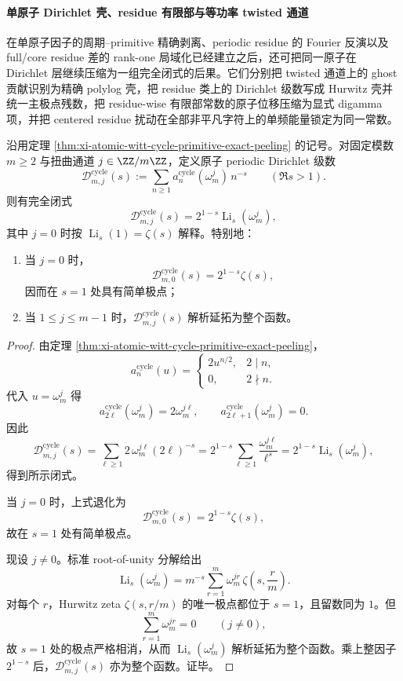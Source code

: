 \paragraph{单原子 Dirichlet 壳、residue 有限部与等功率 twisted 通道}
在单原子因子的周期--primitive 精确剥离、periodic residue 的 Fourier 反演以及 full/core residue 差的 rank-one 局域化已经建立之后，还可把同一原子在 Dirichlet 层继续压缩为一组完全闭式的后果。它们分别把 twisted 通道上的 ghost 贡献识别为精确 polylog 壳，把 residue 类上的 Dirichlet 级数写成 Hurwitz 壳并统一主极点残数，把 residue-wise 有限部常数的原子位移压缩为显式 digamma 项，并把 centered residue 扰动在全部非平凡字符上的单频能量锁定为同一常数。

\begin{theorem}\label{thm:xi-time-part77-atomic-twisted-dirichlet-polylog-shell}
沿用定理 \ref{thm:xi-atomic-witt-cycle-primitive-exact-peeling} 的记号。对固定模数 \(m\ge 2\) 与扭曲通道 \(j\in \ZZ/m\ZZ\)，定义原子 periodic Dirichlet 级数
\[
\mathcal D^{\mathrm{cycle}}_{m,j}(s)
:=
\sum_{n\ge 1}a_n^{\mathrm{cycle}}(\omega_m^j)\,n^{-s}
\qquad (\Re s>1).
\]
则有完全闭式
\[
\mathcal D^{\mathrm{cycle}}_{m,j}(s)
=
2^{1-s}\operatorname{Li}_s(\omega_m^j),
\]
其中 \(j=0\) 时按 \(\operatorname{Li}_s(1)=\zeta(s)\) 解释。特别地：
\begin{enumerate}
  \item 当 \(j=0\) 时，
  \[
  \mathcal D^{\mathrm{cycle}}_{m,0}(s)=2^{1-s}\zeta(s),
  \]
  因而在 \(s=1\) 处具有简单极点；
  \item 当 \(1\le j\le m-1\) 时，\(\mathcal D^{\mathrm{cycle}}_{m,j}(s)\) 解析延拓为整个函数。
\end{enumerate}
\end{theorem}
\begin{proof}
由定理 \ref{thm:xi-atomic-witt-cycle-primitive-exact-peeling}，
\[
a_n^{\mathrm{cycle}}(u)=
\begin{cases}
2u^{n/2},& 2\mid n,\\
0,& 2\nmid n.
\end{cases}
\]
代入 \(u=\omega_m^j\) 得
\[
a_{2\ell}^{\mathrm{cycle}}(\omega_m^j)=2\omega_m^{j\ell},
\qquad
a_{2\ell+1}^{\mathrm{cycle}}(\omega_m^j)=0.
\]
因此
\[
\mathcal D^{\mathrm{cycle}}_{m,j}(s)
=
\sum_{\ell\ge 1}2\,\omega_m^{j\ell}(2\ell)^{-s}
=
2^{1-s}\sum_{\ell\ge 1}\frac{\omega_m^{j\ell}}{\ell^s}
=
2^{1-s}\operatorname{Li}_s(\omega_m^j),
\]
得到所示闭式。

当 \(j=0\) 时，上式退化为
\[
\mathcal D^{\mathrm{cycle}}_{m,0}(s)=2^{1-s}\zeta(s),
\]
故在 \(s=1\) 处有简单极点。

现设 \(j\neq 0\)。标准 root-of-unity 分解给出
\[
\operatorname{Li}_s(\omega_m^j)
=
m^{-s}\sum_{r=1}^{m}\omega_m^{jr}\,\zeta\!\left(s,\frac{r}{m}\right).
\]
对每个 \(r\)，Hurwitz zeta \(\zeta(s,r/m)\) 的唯一极点都位于 \(s=1\)，且留数同为 \(1\)。但
\[
\sum_{r=1}^{m}\omega_m^{jr}=0
\qquad (j\neq 0),
\]
故 \(s=1\) 处的极点严格相消，从而 \(\operatorname{Li}_s(\omega_m^j)\) 解析延拓为整个函数。乘上整因子 \(2^{1-s}\) 后，\(\mathcal D^{\mathrm{cycle}}_{m,j}(s)\) 亦为整个函数。证毕。
\end{proof}

